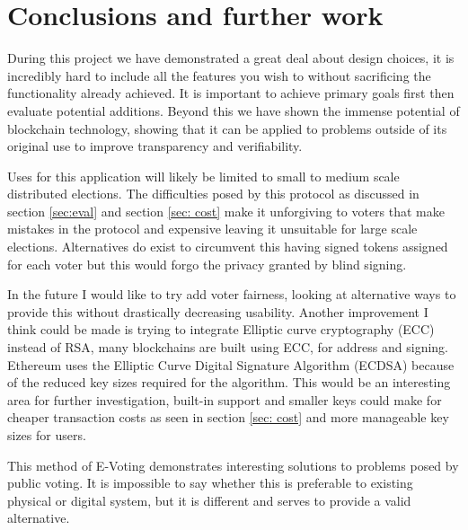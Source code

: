 \documentclass{entcs}
\begin{document}
\section{Conclusions and further work}
During this project we have demonstrated a great deal about design choices, it is incredibly hard to include all the features you wish to without sacrificing the functionality already achieved. It is important to achieve primary goals first then evaluate potential additions. Beyond this we have shown the immense potential of blockchain technology, showing that it can be applied to problems outside of its original use to improve transparency and verifiability.

Uses for this application will likely be limited to small to medium scale distributed elections. The difficulties posed by this protocol as discussed in section \ref{sec:eval} and section \ref{sec: cost} make it unforgiving to voters that make mistakes in the protocol and expensive leaving it unsuitable for large scale elections. Alternatives do exist to circumvent this having signed tokens assigned for each voter but this would forgo the privacy granted by blind signing.

In the future I would like to try add voter fairness, looking at alternative ways to provide this without drastically decreasing usability. Another improvement I think could be made is trying to integrate Elliptic curve cryptography (ECC) instead of RSA, many blockchains are built using ECC, for address and signing. Ethereum uses the Elliptic Curve Digital Signature Algorithm (ECDSA) because of the reduced key sizes required for the algorithm. This would be an interesting area for further investigation, built-in support and smaller keys could make for cheaper transaction costs as seen in section \ref{sec: cost} and more manageable key sizes for users.

This method of E-Voting demonstrates interesting solutions to problems posed by public voting. It is impossible to say whether this is preferable to existing physical or digital system, but it is different and serves to provide a valid alternative. 

\printbibliography
\end{document}
